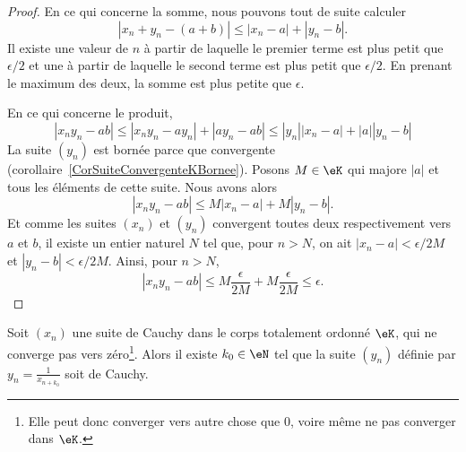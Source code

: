 \begin{proof}
        En ce qui concerne la somme, nous pouvons tout de suite calculer
            \begin{equation}
                | x_n+y_n-(a+b) |\leq | x_n-a |+| y_n-b |.
            \end{equation}
            Il existe une valeur de \( n\) à partir de laquelle le premier terme est plus petit que \( \epsilon/2\) et une à partir de laquelle le second terme est plus petit que \( \epsilon/2\). En prenant le maximum des deux, la somme est plus petite que \( \epsilon\).

            En ce qui concerne le produit,
            \begin{equation}
                | x_ny_n-ab |\leq | x_ny_n-ay_n |+| ay_n-ab |\leq | y_n | | x_n-a |+ | a | | y_n-b |
            \end{equation}
            La suite \( (y_n)\) est bornée parce que convergente (corollaire~\ref{CorSuiteConvergenteKBornee}). Posons \( M \in \eK \) qui majore \(|a|\) et tous les éléments de cette suite. Nous avons alors
            \begin{equation}
                | x_ny_n-ab |\leq  M | x_n-a | +  M | y_n-b |.
            \end{equation}
            Et comme les suites \( (x_n) \) et \( (y_n)\) convergent toutes deux respectivement vers \( a \) et \( b \), il existe un entier naturel \( N \) tel que, pour \( n > N \), on ait \( | x_n-a | < \epsilon/2M \) et \( | y_n-b | < \epsilon/2M \). Ainsi, pour  \( n > N \),
            \begin{equation}
              | x_ny_n-ab |\leq M \frac \epsilon {2M} + M \frac \epsilon {2M} \leq \epsilon.
            \end{equation}
\end{proof}

\begin{proposition}\label{PropSuiteDInverses}
            Soit \( (x_n)\) une suite de Cauchy dans le corps totalement ordonné \(\eK\), qui ne converge pas vers zéro\footnote{Elle peut donc converger vers autre chose que 0, voire même ne pas converger dans $\eK$.}. Alors il existe \( k_0 \in \eN \) tel que la suite \( (y_n) \) définie par \( y_n = \frac{1}{ x_{n+k_0} } \) soit de Cauchy.
\end{proposition}

